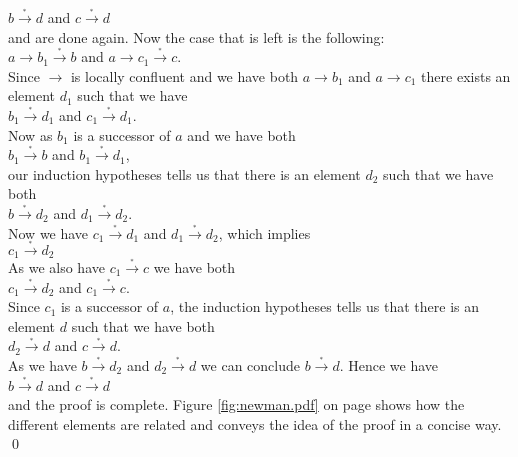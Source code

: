 \hspace*{1.3cm}
$b \stackrel{_*}{\rightarrow} d$ \quad and \quad $c \stackrel{_*}{\rightarrow} d$
\\[0.2cm]
and are done again.  Now the case that is left is the following:
\\[0.2cm]
\hspace*{1.3cm}
$a \rightarrow b_1 \stackrel{_*}{\rightarrow} b$ \quad and \quad $a \rightarrow c_1 \stackrel{_*}{\rightarrow} c$.
\\[0.2cm]
Since $\rightarrow$ is locally confluent and we have both $a \rightarrow b_1$ and  $a \rightarrow c_1$ 
there exists an element $d_1$ such that we have
\\[0.2cm]
\hspace*{1.3cm}
$b_1 \stackrel{_*}{\rightarrow} d_1$ \quad and \quad $c_1 \stackrel{_*}{\rightarrow} d_1$.
\\[0.2cm]
Now as $b_1$ is a successor of $a$ and we have both
\\[0.2cm]
\hspace*{1.3cm}
$b_1 \stackrel{_*}{\rightarrow} b$ \quad and \quad $b_1 \stackrel{_*}{\rightarrow} d_1$,
\\[0.2cm]
our induction hypotheses tells us that there is an element $d_2$ such that we have both
\\[0.2cm]
\hspace*{1.3cm}
$b \stackrel{_*}{\rightarrow} d_2$ \quad and \quad $d_1 \stackrel{_*}{\rightarrow} d_2$.
\\[0.2cm]
Now we have $c_1 \stackrel{_*}{\rightarrow} d_1$ and $d_1 \stackrel{_*}{\rightarrow} d_2$, which implies
\\[0.2cm]
\hspace*{1.3cm}
$c_1 \stackrel{_*}{\rightarrow} d_2$
\\[0.2cm]
As we also have $c_1 \stackrel{_*}{\rightarrow} c$ we have both
\\[0.2cm]
\hspace*{1.3cm}
$c_1 \stackrel{_*}{\rightarrow} d_2$ \quad and \quad $c_1 \stackrel{_*}{\rightarrow} c$.
\\[0.2cm]
Since $c_1$ is a successor of $a$, the induction hypotheses tells us that there is an element $d$ such that we
have both
\\[0.2cm]
\hspace*{1.3cm}
$d_2 \stackrel{_*}{\rightarrow} d$ \quad and \quad $c \stackrel{_*}{\rightarrow} d$.
\\[0.2cm]
As we have $b \stackrel{_*}{\rightarrow} d_2$ and $d_2 \stackrel{_*}{\rightarrow} d$ we can conclude $b \stackrel{_*}{\rightarrow} d$.  Hence we have
\\[0.2cm]
\hspace*{1.3cm}
$b \stackrel{_*}{\rightarrow} d$ \quad  and \quad $c \stackrel{_*}{\rightarrow} d$
\\[0.2cm]
and the proof is complete.  Figure \ref{fig:newman.pdf} on page \pageref{fig:newman.pdf} shows how the
different elements are related and conveys the idea of the proof in a concise way. \qed

